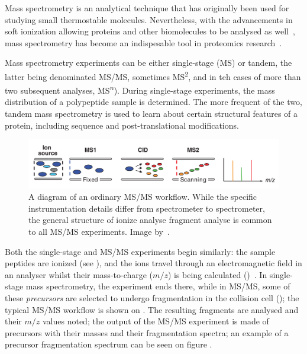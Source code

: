 Mass spectrometry is an analytical technique that has originally been used for studying small thermostable molecules. Nevertheless, with the advancements in soft ionization allowing proteins and other biomolecules to be analysed as well~\cite{fenn1989electrospray}, mass spectrometry has become an indispesable tool in proteomics research~\cite{collins2003human}.

Mass spectrometry experiments can be either single-stage (MS) or tandem, the latter being denominated MS/MS, sometimes MS\textsuperscript{2}, and in teh cases of more than two subsequent analyses, MS\textsuperscript{\(n\)}). During single-stage experiments, the mass distribution of a polypeptide sample is determined. The more frequent of the two, tandem mass spectrometry is used to learn about certain structural features of a protein, including sequence and post-translational modifications.

\begin{figure}
  \centering
  \includegraphics[width=.9\linewidth]{img/msms-workflow.png}
  \caption{A diagram of an ordinary MS/MS workflow. While the specific instrumentation details differ from spectrometer to spectrometer, the general structure of ionize \textrightarrow{} analyse \textrightarrow{} fragment \textrightarrow{} analyse is common to all MS/MS experiments. Image by~\citet{domon2006mass}.}\label{fig:mass-spectrometry-workflow}
\end{figure}

Both the single-stage and MS/MS experiments begin similarly: the sample peptides are ionized (see ), and the ions travel through an electromagnetic field in an analyser whilst their mass-to-charge (\(m/z\)) is being calculated ()~\cite{gross2006mass}. In single-stage mass spectrometry, the experiment ends there, while in MS/MS, some of these \emph{precursors} are selected to undergo fragmentation in the collision cell (); the typical MS/MS workflow is shown on . The resulting fragments are analysed and their \(m/z\) values noted; the output of the MS/MS experiment is made of precursors with their masses and their fragmentation spectra; an example of a precursor fragmentation spectrum can be seen on figure .

